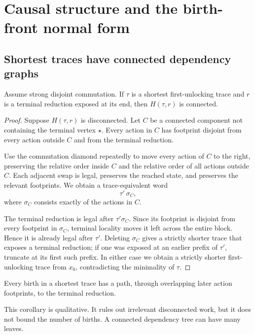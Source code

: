 \section{Causal structure and the birth-front normal form}
\label{sec:causal}

\subsection{Shortest traces have connected dependency graphs}

\begin{theorem}
\label{thm:causal-connected}
Assume strong disjoint commutation.  If $\tau$ is a shortest first-unlocking
trace and $r$ is a terminal reduction exposed at its end, then
$H(\tau,r)$ is connected.
\end{theorem}

\begin{proof}
Suppose $H(\tau,r)$ is disconnected.  Let $C$ be a connected component not
containing the terminal vertex $\star$.  Every action in $C$ has footprint
disjoint from every action outside $C$ and from the terminal reduction.

Use the commutation diamond repeatedly to move every action of $C$ to the right,
preserving the relative order inside $C$ and the relative order of all actions
outside $C$.  Each adjacent swap is legal, preserves the reached state, and
preserves the relevant footprints.  We obtain a trace-equivalent word
\[
   \tau'\,\sigma_C,
\]
where $\sigma_C$ consists exactly of the actions in $C$.

The terminal reduction is legal after $\tau'\sigma_C$.  Since its footprint is
disjoint from every footprint in $\sigma_C$, terminal locality moves it left
across the entire block.  Hence it is already legal after $\tau'$.  Deleting
$\sigma_C$ gives a strictly shorter trace that exposes a terminal reduction;
if one was exposed at an earlier prefix of $\tau'$, truncate at its first such
prefix.  In either case we obtain a strictly shorter first-unlocking trace from
$x_0$, contradicting the minimality of $\tau$.
\end{proof}

\begin{corollary}
Every birth in a shortest trace has a path, through overlapping later action
footprints, to the terminal reduction.
\end{corollary}

This corollary is qualitative.  It rules out irrelevant disconnected work, but
it does not bound the number of births.  A connected dependency tree can have
many leaves.

